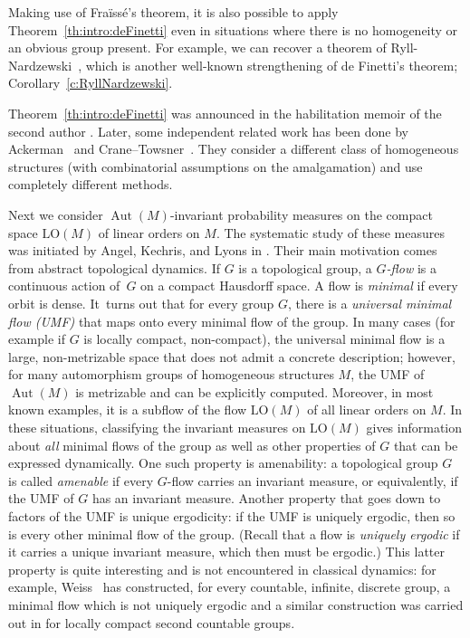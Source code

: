 \documentclass[JEP,XML,SOM,Unicode,published]{cedram}
\theoremstyle{plain}
\theoremstyle{definition}
\DeclareMathOperator{\Aut}{Aut}
\newcommand{\LO}{\mathrm{LO}}
\begin{document}
Making use of Fraïssé's theorem, it is also possible to apply Theorem~\ref{th:intro:deFinetti} even in situations where there is no homogeneity or an obvious group present. For example, we can recover a theorem of Ryll-Nardzewski~\cite{RyllNardzewski1957}, which is another well-known strengthening of de Finetti's theorem; \cf Corollary~\ref{c:RyllNardzewski}.

Theorem~\ref{th:intro:deFinetti} was announced in the habilitation memoir of the second author \cite{Tsankov2014}. Later, some independent related work has been done by Ackerman~\cite{Ackerman2015p} and Crane--Towsner~\cite{Crane2018}. They consider a different class of homogeneous structures (with combinatorial assumptions on the amalgamation) and use completely different methods.\enlargethispage{.5\baselineskip}%

Next we consider $\Aut(M)$-invariant probability measures on the compact space $\LO(M)$ of linear orders on $M$. The systematic study of these measures was initiated by Angel, Kechris, and Lyons in \cite{Angel2014}. Their main motivation comes from abstract topological dynamics. If $G$ is a topological group, a \emph{$G$-flow} is a continuous action of~$G$ on a compact Hausdorff space. A flow is \emph{minimal} if every orbit is dense. It~turns out that for every group $G$, there is a \emph{universal minimal flow (UMF)} that maps onto every minimal flow of the group. In many cases (for example if $G$ is locally compact, non-compact), the universal minimal flow is a large, non-metrizable space that does not admit a concrete description; however, for many automorphism groups of homogeneous structures $M$, the UMF of $\Aut(M)$ is metrizable and can be explicitly computed. Moreover, in most known examples, it is a subflow of the flow $\LO(M)$ of all linear orders on $M$. In these situations, classifying the invariant measures on $\LO(M)$ gives information about \emph{all} minimal flows of the group as well as other properties of $G$ that can be expressed dynamically. One such property is amenability: a topological group $G$ is called \emph{amenable} if every $G$-flow carries an invariant measure, or equivalently, if the UMF of $G$ has an invariant measure. Another property that goes down to factors of the UMF is unique ergodicity: if the UMF is uniquely ergodic, then so is every other minimal flow of the group. (Recall that a flow is \emph{uniquely ergodic} if it carries a unique invariant measure, which then must be ergodic.) This latter property is quite interesting and is not encountered in classical dynamics: for example, Weiss~\cite{Weiss2012} has constructed, for every countable, infinite, discrete group, a minimal flow which is not uniquely ergodic and a similar construction was carried out in \cite{Jahel2020p} for locally compact second countable groups.
\end{document}
